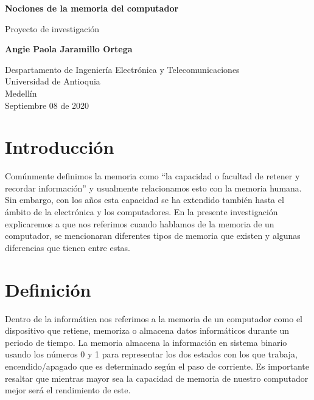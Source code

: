 \documentclass{article}
\begin{document}
\begin{titlepage}
    \begin{center}
        \vspace*{1cm}
            
        \Huge
        \textbf{Nociones de la memoria del computador}
            
        \vspace{0.5cm}
        \LARGE
        Proyecto de investigación
            
        \vspace{1.5cm}
            
        \textbf{Angie Paola Jaramillo Ortega}
            
        \vfill
            
        \vspace{0.8cm}
            
        \Large
        Despartamento de Ingeniería Electrónica y Telecomunicaciones\\
        Universidad de Antioquia\\
        Medellín\\
        Septiembre 08 de 2020
            
    \end{center}
\end{titlepage}

\tableofcontents
\newpage

\section{Introducción}
Comúnmente definimos la memoria como ``la capacidad o facultad de retener y recordar información''\cite{definicion} y usualmente relacionamos esto con la memoria humana. Sin embargo, con los años esta capacidad se ha extendido también hasta el ámbito de la electrónica y los computadores. En la presente investigación explicaremos a que nos referimos cuando hablamos de la memoria de un computador, se mencionaran diferentes tipos de memoria que existen y algunas diferencias que tienen entre estas.


\section{Definición}
Dentro de la informática nos referimos a la memoria de un computador como el dispositivo que retiene, memoriza o almacena datos informáticos durante un periodo de tiempo. La memoria almacena la información en sistema binario usando los números 0 y 1 para representar los dos estados con los que trabaja, encendido/apagado que es determinado según el paso de corriente. Es importante resaltar que mientras mayor sea la capacidad de memoria de nuestro computador mejor será el rendimiento de este.
\end{document}
